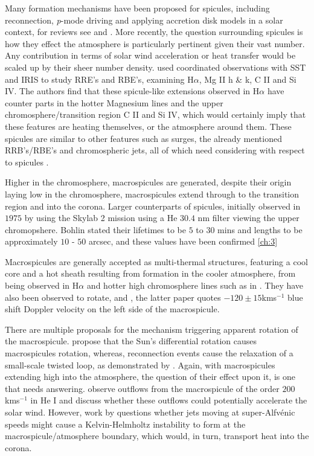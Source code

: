 Many formation mechanisms have been proposed for spicules, including reconnection, \emph{p}-mode driving and applying accretion disk models in a solar context, for reviews see \cite{Sterling2000} and \cite{Zaqara_Erdelyi2009}.
More recently, the question surrounding spicules is how they effect the atmosphere is particularly pertinent given their vast number. 
Any contribution in terms of solar wind acceleration or heat transfer would be scaled up by their sheer number density.
\cite{Rouppe2015} used coordinated observations with SST and IRIS to study RRE's and RBE's, examining H$\alpha$, Mg II h \& k, C II and Si IV.
The authors find that these spicule-like extensions observed in H$\alpha$ have counter parts in the hotter Magnesium lines and the upper chromosphere/transition region C II and Si IV, which would certainly imply that these features are heating themselves, or the atmosphere around them.
These spicules are similar to other features such as surges, the already mentioned RRB's/RBE's and chromospheric jets, all of which need considering with respect to spicules \cite{Tsiropoula2012, Kuridze2015}.


Higher in the chromosphere, macrospicules are generated, despite their origin laying low in the chromosphere, macrospicules extend through to the transition region and into the corona. 
Larger counterparts of spicules, initially observed in $1975$ by \cite{Bohlin1975} using the Skylab 2 mission using a He $30.4$ nm filter viewing the upper chromopshere.
Bohlin stated their lifetimes to be $5$ to $30$ mins and lengths to be approximately $10$ - $50$ arcsec, and these values have been confirmed \cref{ch:3}

Macrospicules are generally accepted as multi-thermal structures, featuring a cool core and a hot sheath resulting from formation in the cooler atmosphere, from being observed in H$\alpha$ \citep{LaBonte79} and hotter high chromosphere lines such as in \cite{Parenti2002}.
They have also been observed to rotate, \cite{Pike_Mason1998} and \cite{Kamio2010}, the latter paper quotes $-120 \pm 15$kms$^{-1}$ blue shift Doppler velocity on the left side of the macrospicule. 

There are multiple proposals for the mechanism triggering apparent rotation of the macrospicule. 
\cite{Curdt2011} propose that the Sun's differential rotation causes macrospicules rotation, whereas, reconnection events cause the relaxation of a small-scale twisted loop, as demonstrated by \cite{Adams2014}.
Again, with macrospicules extending high into the atmosphere, the question of their effect upon it, is one that needs answering.
\cite{Pike1997} observe outflows from the macrospicule of the order $200$ kms$^{-1}$ in He I and discuss whether these outflows could potentially accelerate the solar wind.
However, work by \cite{Zaqarashvili2014} questions whether jets moving at super-Alfv{\'e}nic speeds might cause a Kelvin-Helmholtz instability to form at the macrospicule/atmosphere boundary, which would, in turn, transport heat into the corona.

